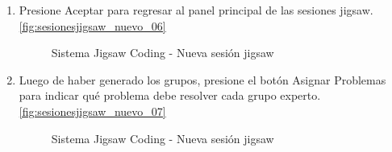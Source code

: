 \begin{enumerate}
\begin{figure}[h!]
	\end{figure}
	\item Presione Aceptar para regresar al panel principal de las sesiones jigsaw. \autoref{fig:sesionesjigsaw_nuevo_06}
	\begin{figure}[h!]
		\centering
		\caption{Sistema Jigsaw Coding - Nueva sesión jigsaw}
		\label{fig:sesionesjigsaw_nuevo_06}
	\end{figure}
	\item Luego de haber generado los grupos, presione el botón Asignar Problemas para indicar qué problema debe resolver cada grupo experto. \autoref{fig:sesionesjigsaw_nuevo_07}
	\begin{figure}[h!]
		\centering
		\caption{Sistema Jigsaw Coding - Nueva sesión jigsaw}
		\label{fig:sesionesjigsaw_nuevo_07}

\end{figure}
\end{enumerate}

